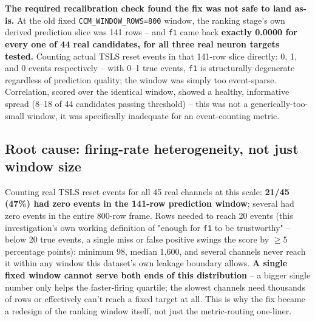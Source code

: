 \documentclass[11pt]{article}
\begin{document}
\textbf{The required recalibration check found the fix was not safe to land as-is.} At the old fixed \texttt{CCM\_WINDOW\_ROWS=800} window, the ranking stage's own derived prediction slice was 141 rows -- and \texttt{f1} came back \textbf{exactly 0.0000 for every one of 44 real candidates, for all three real neuron targets tested.} Counting actual TSLS reset events in that 141-row slice directly: 0, 1, and 0 events respectively -- with 0--1 true events, \texttt{f1} is structurally degenerate regardless of prediction quality; the window was simply too event-sparse. Correlation, scored over the identical window, showed a healthy, informative spread (8--18 of 44 candidates passing threshold) -- this was not a generically-too-small window, it was specifically inadequate for an event-counting metric.

\subsection{Root cause: firing-rate heterogeneity, not just window size}
Counting real TSLS reset events for all 45 real channels at this scale: \textbf{21/45 (47\%) had zero events in the 141-row prediction window}; several had zero events in the entire 800-row frame. Rows needed to reach 20 events (this investigation's own working definition of "enough for \texttt{f1} to be trustworthy" -- below 20 true events, a single miss or false positive swings the score by $\ge 5$ percentage points): minimum 98, median 1{,}600, and several channels never reach it within any window this dataset's own leakage boundary allows. \textbf{A single fixed window cannot serve both ends of this distribution} -- a bigger single number only helps the faster-firing quartile; the slowest channels need thousands of rows or effectively can't reach a fixed target at all. This is why the fix became a redesign of the ranking window itself, not just the metric-routing one-liner.
\end{document}
